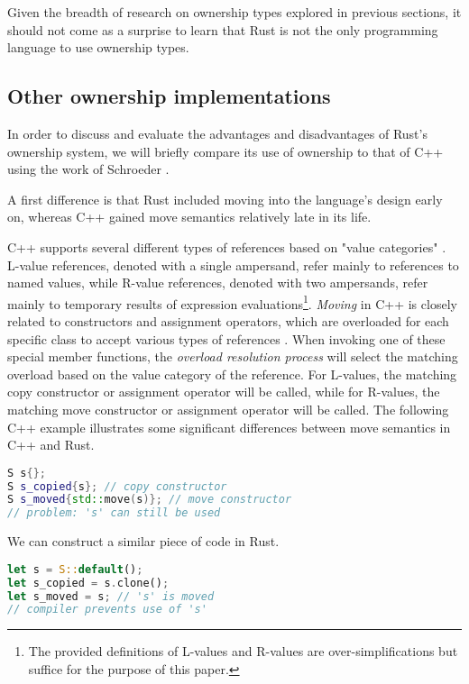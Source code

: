 \documentclass[sigplan,11pt,nonacm]{acmart}
\begin{document}
Given the breadth of research on ownership types explored in previous sections, it should not come as a surprise to learn that Rust is not the only programming language to use ownership types.

\subsection{Other ownership implementations}
\label{sec:other-ownership-implementations}

In order to discuss and evaluate the advantages and disadvantages of Rust's ownership system, we will briefly compare its use of ownership to that of C++ using the work of Schroeder \cite{cpp-rust-ownership}.

A first difference is that Rust included moving into the language's design early on, whereas C++ gained move semantics relatively late in its life.

C++ supports several different types of references based on "value categories" \cite{cpp-value-categories}.
L-value references, denoted with a single ampersand, refer mainly to references to named values, while R-value references, denoted with two ampersands, refer mainly to temporary results of expression evaluations\footnote{The provided definitions of L-values and R-values are over-simplifications but suffice for the purpose of this paper.}.
\emph{Moving} in C++ is closely related to constructors and assignment operators, which are overloaded for each specific class to accept various types of references \cite{cpp-rust-ownership}.
When invoking one of these special member functions, the \emph{overload resolution process} will select the matching overload based on the value category of the reference.
For L-values, the matching copy constructor or assignment operator will be called, while for R-values, the matching move constructor or assignment operator will be called.
The following C++ example illustrates some significant differences between move semantics in C++ and Rust.

\begin{lstlisting}[language=C++,captionpos=b,caption={C++ move semantics}]
S s{};
S s_copied{s}; // copy constructor
S s_moved{std::move(s)}; // move constructor
// problem: 's' can still be used
\end{lstlisting}

We can construct a similar piece of code in Rust.

\begin{lstlisting}[language=Rust,captionpos=b,caption={Rust move semantics}]
let s = S::default();
let s_copied = s.clone();
let s_moved = s; // 's' is moved
// compiler prevents use of 's'
\end{lstlisting}
\end{document}
